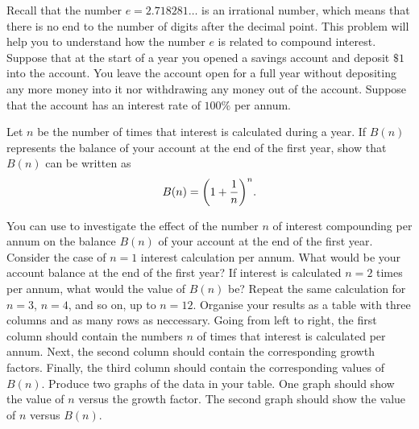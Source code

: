 \documentclass[a4paper,oneside,12pt]{article}
\begin{document}
\begin{problem}
\item Recall that the number $e = 2.718281\dots$ is an irrational
  number, which means that there is no end to the number of digits
  after the decimal point.  This problem will help you to understand
  how the number $e$ is related to compound interest.  Suppose that at
  the start of a year you opened a savings account and deposit $\$1$
  into the account.  You leave the account open for a full year
  without depositing any more money into it nor withdrawing any money
  out of the account.  Suppose that the account has an interest rate
  of $100\%$ per annum.
  \begin{packedenum}
  \item\label{subprob:e_balance_formula}
    Let $n$ be the number of times that interest is calculated during
    a year.  If $B(n)$ represents the balance of your account at the
    end of the first year, show that $B(n)$ can be written as
    \begin{equation}
    \label{eqn:e_savings_first_year_n_compounding}
    B(n)
    =
    \parenthesis*{
      1 + \frac{1}{n}
    }^n.
    \end{equation}

  \item\label{subprob:e_balance_up_to_12_compounding}
    You can use  to
    investigate the effect of the number $n$ of interest compounding
    per annum on the balance $B(n)$ of your account at the end of the
    first year.  Consider the case of $n = 1$ interest calculation per
    annum.  What would be your account balance at the end of the first
    year?  If interest is calculated $n = 2$ times per annum, what
    would the value of $B(n)$ be?  Repeat the same calculation for
    $n = 3$, $n = 4$, and so on, up to $n = 12$.  Organise your
    results as a table with three columns and as many rows as
    neccessary.  Going from left to right, the first column should
    contain the numbers $n$ of times that interest is calculated per
    annum.  Next, the second column should contain the corresponding
    growth factors.  Finally, the third column should contain the
    corresponding values of $B(n)$.  Produce two graphs of the data in
    your table.  One graph should show the value of $n$ versus the
    growth factor.  The second graph should show the value of $n$
    versus $B(n)$.


\end{packedenum}
\end{problem}
\end{document}
